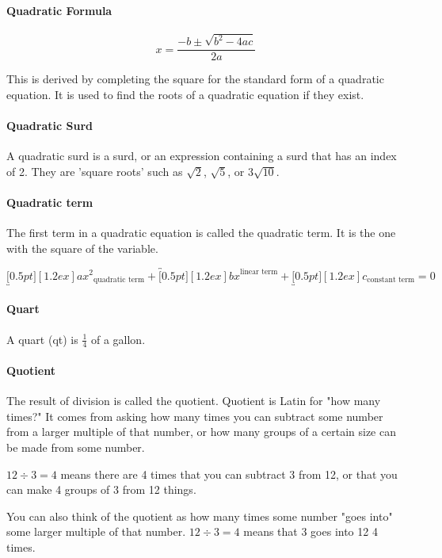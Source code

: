 \documentclass[12pt]{article}
\begin{document}
{\paragraph{Quadratic Formula}
$$x = \frac{-b\pm\sqrt{b^2 - 4ac}}{2a}$$

This is derived by completing the square for the standard form of a quadratic equation. It is used to find the roots of a quadratic equation if they exist.

\paragraph{Quadratic Surd}
A quadratic surd is a surd, or an expression containing a surd that has an index of 2. They are 'square roots’ such as $\sqrt{2}$, $\sqrt{5}$, or $3\sqrt{10}$.

\paragraph{Quadratic term}
The first term in a quadratic equation is called the quadratic term. It is the one with the square of the variable.

\begin{center}
{\Large$\underbracket[0.5pt][1.2ex]{ax^2}_{\textrm{quadratic term}}+\overbracket[0.5pt][1.2ex]{bx}^{\textrm{linear term}}+\underbracket[0.5pt][1.2ex]{c}_{\textrm{constant term}}=0$}
\end{center}

\paragraph{Quart}
A quart (qt) is $\frac{1}{4}$ of a gallon.

\paragraph{Quotient}
The result of division is called the quotient. Quotient is Latin for "how many times?" It comes from asking how many times you can subtract some number from a larger multiple of that number, or how many groups of a certain size can be made from some number.

$12 \div 3 = 4$ means there are 4 times that you can subtract 3 from 12, or that you can make 4 groups of 3 from 12 things.

You can also think of the quotient as how many times some number "goes into" some larger multiple of that number. $12 \div 3 = 4$ means that 3 goes into 12 4 times.

}
\end{document}

